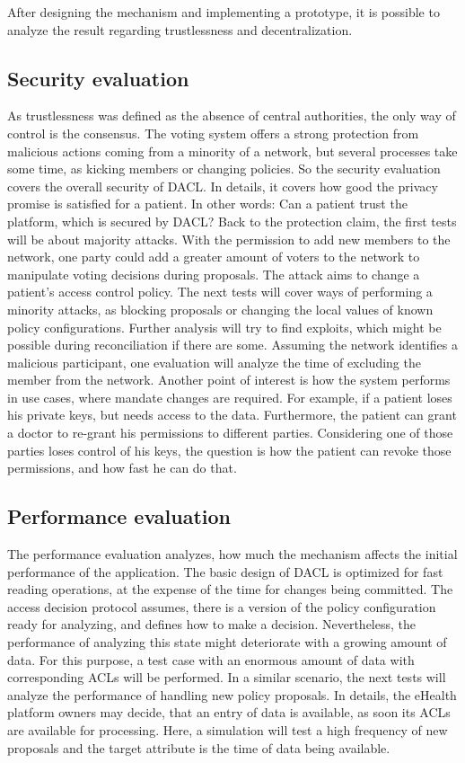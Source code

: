 \documentclass[12pt, conference]{IEEEtran}
\begin{document}
After designing the mechanism and implementing a prototype, it is possible to analyze the result regarding trustlessness and decentralization.

\subsection{Security evaluation}

As trustlessness was defined as the absence of central authorities, the only way of control is the consensus. The voting system offers a strong protection from malicious actions coming from a minority of a network, but several processes take some time, as kicking members or changing policies. So the security evaluation covers the overall security of DACL. In details, it covers how good the privacy promise is satisfied for a patient. In other words: Can a patient trust the platform, which is secured by DACL?
Back to the protection claim, the first tests will be about majority attacks. With the permission to add new members to the network, one party could add a greater amount of voters to the network to manipulate voting decisions during proposals. The attack aims to change a patient's access control policy. 
The next tests will cover ways of performing a minority attacks, as blocking proposals or changing the local values of known policy configurations. Further analysis will try to find exploits, which might be possible during reconciliation if there are some.
Assuming the network identifies a malicious participant, one evaluation will analyze the time of excluding the member from the network.
Another point of interest is how the system performs in use cases, where mandate changes are required. For example, if a patient loses his private keys, but needs access to the data. Furthermore, the patient can grant a doctor to re-grant his permissions to different parties. Considering one of those parties loses control of his keys, the question is how the patient can revoke those permissions, and how fast he can do that.


\subsection{Performance evaluation}

The performance evaluation analyzes, how much the mechanism affects the initial performance of the application. The basic design of DACL is optimized for fast reading operations, at the expense of the time for changes being committed. The access decision protocol assumes, there is a version of the policy configuration ready for analyzing, and defines how to make a decision. Nevertheless, the performance of analyzing this state might deteriorate with a growing amount of data. For this purpose, a test case with an enormous amount of data with corresponding ACLs will be performed. 
In a similar scenario, the next tests will analyze the performance of handling new policy proposals. In details, the eHealth platform owners may decide, that an entry of data is available, as soon its ACLs are available for processing. Here, a simulation will test a high frequency of new proposals and the target attribute is the time of data being available.
\end{document}
